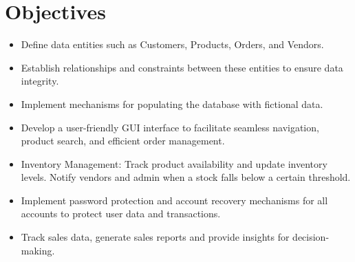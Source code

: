 \documentclass{article}
\begin{document}
\section{Objectives}
\begin{itemize}
\item Define data entities such as Customers, Products, Orders, and Vendors.

\item Establish relationships and constraints between these entities to ensure data integrity.

\item Implement mechanisms for populating the database with fictional data.

\item Develop a user-friendly GUI interface to facilitate seamless navigation, product search, and efficient order management.

\item Inventory Management: Track product availability and update inventory levels. Notify vendors and admin when a stock falls below a certain threshold.

\item Implement password protection and account recovery mechanisms for all accounts to protect user data and transactions.

\item Track sales data, generate sales reports and provide insights for decision-making.
\end{itemize}
\
\end{document}
